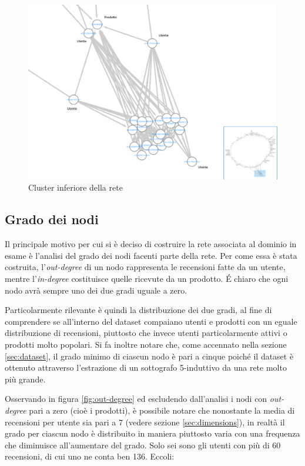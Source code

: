 \documentclass[hidelinks, 12pt]{article}
\begin{document}
\begin{figure}[H]
	\centering
	\includegraphics[scale=0.36]{images/03_03_cyto_net_3.png}
	\caption[Cluster inferiore della rete]{Cluster inferiore della rete}
	\label{fig:cyto-net-3}
\end{figure}



\subsection{Grado dei nodi}
\label{sec:nodes-degree}

Il principale motivo per cui si è deciso di costruire la rete associata al dominio in esame è l'analisi del grado dei nodi facenti parte della rete. Per come essa è stata costruita, l'\textit{out-degree} di un nodo rappresenta le recensioni fatte da un utente, mentre l'\textit{in-degree} costituisce quelle ricevute da un prodotto. É chiaro che ogni nodo avrà sempre uno dei due gradi uguale a zero.

Particolarmente rilevante è quindi la distribuzione dei due gradi, al fine di comprendere se all'interno del dataset compaiano utenti e prodotti con un eguale distribuzione di recensioni, piuttosto che invece utenti particolarmente attivi o prodotti molto popolari. Si fa inoltre notare che, come accennato nella sezione \ref{sec:dataset}, il grado minimo di ciascun nodo è pari a cinque poiché il dataset è ottenuto attraverso l'estrazione di un sottografo 5-induttivo da una rete molto più grande.

Osservando in figura \ref{fig:out-degree} ed escludendo dall'analisi i nodi con \textit{out-degree} pari a zero (cioè i prodotti), è possibile notare che nonostante la media di recensioni per utente sia pari a 7 (vedere sezione \ref{sec:dimensions}), in realtà il grado per ciascun nodo è distribuito in maniera piuttosto varia con una frequenza che diminuisce all'aumentare del grado. Solo sei sono gli utenti con più di 60 recensioni, di cui uno ne conta ben 136. Eccoli:
\end{document}

